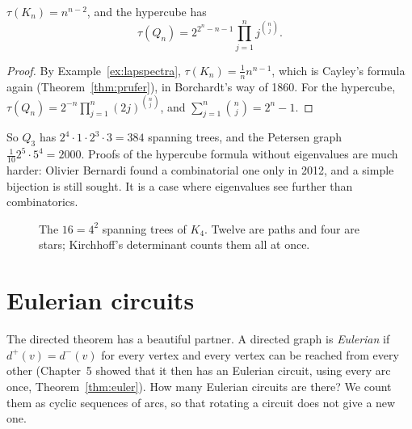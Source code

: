 \begin{corollary}\label{cor:treecounts}
$\tau(K_n)=n^{n-2}$, and the hypercube has
\[
\tau(Q_n)=2^{2^n-n-1}\prod_{j=1}^nj^{\binom nj}.
\]
\end{corollary}
\begin{proof}
By Example~\ref{ex:lapspectra}, $\tau(K_n)=\frac1nn^{n-1}$, which is Cayley's formula again (Theorem~\ref{thm:prufer}), in Borchardt's way of 1860. For the hypercube,
$\tau(Q_n)=2^{-n}\prod_{j=1}^n(2j)^{\binom nj}$, and $\sum_{j=1}^n\binom nj=2^n-1$.
\end{proof}

So $Q_3$ has $2^4\cdot1\cdot2^3\cdot3=384$ spanning trees, and the Petersen graph $\frac1{10}2^5\cdot5^4=2000$. Proofs of the hypercube formula without eigenvalues are much harder: Olivier Bernardi found a combinatorial one only in 2012, and a simple bijection is still sought.
It is a case where eigenvalues see further than combinatorics.

\begin{figure}[ht]
\centering
{}
\caption{The $16=4^2$ spanning trees of $K_4$. Twelve are paths and four are stars; Kirchhoff's determinant counts them all at once.}
\label{fig:k4trees}
\end{figure}

\section{Eulerian circuits}

The directed theorem has a beautiful partner. A directed graph is \emph{Eulerian} if $d^+(v)=d^-(v)$ for every vertex and every vertex can be reached from every
other (Chapter~5 showed that it then has an Eulerian circuit, using every arc once, Theorem~\ref{thm:euler}). How many Eulerian circuits are there? We count them as
cyclic sequences of arcs, so that rotating a circuit does not give a new one.

